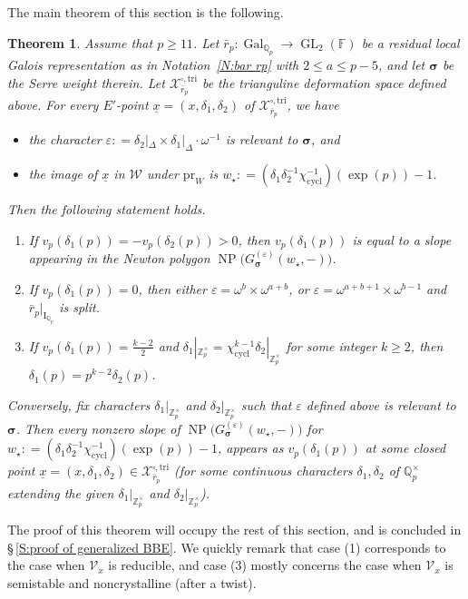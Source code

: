 \documentclass[12pt]{amsart}
\newtheorem{theorem}[subsection]{Theorem}
\theoremstyle{definition}
\numberwithin{equation}{subsection}
\def\calV{\mathcal{V}}
\def\calW{\mathcal{W}}
\def\calX{\mathcal{X}}
\def\FF{\mathbb{F}}
\def\QQ{\mathbb{Q}}
\def\ZZ{\mathbb{Z}}
\def\rmI{\mathrm{I}}
\DeclareMathOperator{\Gal}{Gal}
\DeclareMathOperator{\GL}{GL}
\DeclareMathOperator{\NP}{NP}
\newcommand{\bbsigma}{\boldsymbol{\sigma}}
\newcommand{\cycl}{\mathrm{cycl}}
\newcommand{\pr}{\mathrm{pr}}
\newcommand{\tri}{\mathrm{tri}}
\begin{document}
The main theorem of this section is the following.
\begin{theorem}
\label{T:generalized BBE}
Assume that $p \geq 11$. Let $\bar r_p: \Gal_{\QQ_p} \to \GL_2(\FF)$ be a residual local Galois representation as in Notation~\ref{N:bar rp} with $2 \leq a \leq p-5$, and let $\bbsigma$ be the Serre weight therein. Let $\calX_{\bar r_p}^{\square, \tri}$ be the trianguline deformation space defined above.
For every $E'$-point $\underline x = (x, \delta_1, \delta_2)$ of $\calX_{\bar r_p}^{\square, \tri}$, we have
\begin{itemize}
\item[(a)] the character $\varepsilon : = \delta_2|_{\Delta} \times \delta_1|_\Delta\cdot \omega^{-1}$ is relevant to $\bbsigma$, and 
\item[(b)] the image of $\underline x$ in $\calW$ under $\pr_W$ is $w_\star: = (\delta_1\delta_2^{-1}\chi_\cycl^{-1})(\exp(p)) -1$.
\end{itemize}
Then the following statement holds.
\begin{enumerate}
\item If $v_p(\delta_1(p)) = -v_p(\delta_2(p))>0$, then $v_p(\delta_1(p))$ is equal to a slope appearing in the Newton polygon $\NP\big(G_{\bbsigma}^{(\varepsilon)}(w_\star, -)\big)$.
\item If $v_p(\delta_1(p)) = 0$, then either $\varepsilon = \omega^b \times \omega^{a+b}$, or $\varepsilon = \omega^{a+b+1} \times \omega^{b-1}$ and $\bar r_p|_{\rmI_{\QQ_p}}$ is split.
\item If $v_p(\delta_1(p)) = \frac {k-2}2$ and $\delta_1|_{\ZZ_p^\times} = \chi_\cycl^{k-1}\delta_2|_{\ZZ_p^\times}$ for some integer $k \geq 2$, then $\delta_1(p)=p^{k-2}\delta_2(p)$.
\end{enumerate}
Conversely, fix characters $\delta_1|_{\ZZ_p^\times}$ and $\delta_2|_{\ZZ_p^\times}$ such that $\varepsilon$ defined above is relevant to $\bbsigma$. Then every nonzero slope of $\NP\big(G_{\bbsigma}^{(\varepsilon)}(w_\star, -)\big)$ for $w_\star: = (\delta_1\delta_2^{-1}\chi_\cycl^{-1})(\exp(p)) -1$, appears as $v_p(\delta_1(p))$ at some closed point $\underline x = (x, \delta_1, \delta_2) \in \calX_{\bar r_p}^{\square, \tri}$ (for some continuous characters $\delta_1, \delta_2$ of $\QQ_p^\times$ extending the given $\delta_1|_{\ZZ_p^\times}$ and $\delta_2|_{\ZZ_p^\times}$).
\end{theorem}

The proof of this theorem will occupy the rest of this section, and is concluded in \S\,\ref{S:proof of generalized BBE}. We quickly remark that case (1) corresponds to the case when $\calV_x$ is reducible, and case (3) mostly concerns the case when $\calV_x$ is semistable and noncrystalline (after a twist).
\end{document}
